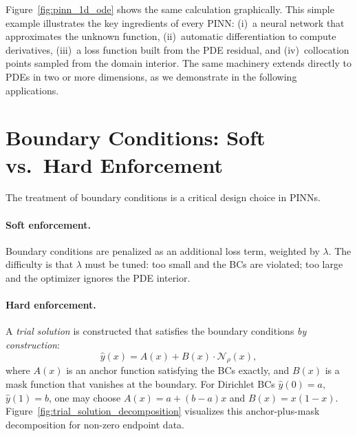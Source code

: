 \documentclass[11pt,a4paper]{report}
\begin{document}
Figure~\ref{fig:pinn_1d_ode} shows the same calculation graphically.  This simple example illustrates the key ingredients of every PINN: (i)~a neural network that approximates the unknown function, (ii)~automatic differentiation to compute derivatives, (iii)~a loss function built from the PDE residual, and (iv)~collocation points sampled from the domain interior.  The same machinery extends directly to PDEs in two or more dimensions, as we demonstrate in the following applications.

\section{Boundary Conditions: Soft vs.\ Hard Enforcement}

The treatment of boundary conditions is a critical design choice in PINNs.

\paragraph{Soft enforcement.}  Boundary conditions are penalized as an additional loss term, weighted by $\lambda$.  The difficulty is that $\lambda$ must be tuned: too small and the BCs are violated; too large and the optimizer ignores the PDE interior.

\paragraph{Hard enforcement.}  A \emph{trial solution} is constructed that satisfies the boundary conditions \emph{by construction}:
\begin{equation}
\hat{y}(x) = A(x) + B(x) \cdot \mathcal{N}_\rho(x),
\label{eq:trial}
\end{equation}
where $A(x)$ is an anchor function satisfying the BCs exactly, and $B(x)$ is a mask function that vanishes at the boundary.  For Dirichlet BCs $\hat{y}(0) = a$, $\hat{y}(1) = b$, one may choose $A(x) = a + (b-a)x$ and $B(x) = x(1-x)$.  Figure~\ref{fig:trial_solution_decomposition} visualizes this anchor-plus-mask decomposition for non-zero endpoint data.
\end{document}
